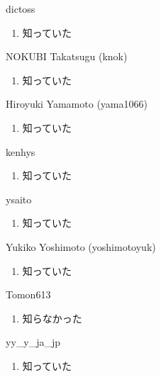 \begin{prework}{ dictoss }
  \begin{enumerate}
  \item 知っていた
  \end{enumerate}
\end{prework}

\begin{prework}{ NOKUBI Takatsugu (knok) }
  \begin{enumerate}
  \item 知っていた
  \end{enumerate}
\end{prework}

\begin{prework}{ Hiroyuki Yamamoto (yama1066) }
  \begin{enumerate}
  \item 知っていた
  \end{enumerate}
\end{prework}

\begin{prework}{ kenhys }
  \begin{enumerate}
  \item 知っていた
  \end{enumerate}
\end{prework}

\begin{prework}{ ysaito }
  \begin{enumerate}
  \item 知っていた
  \end{enumerate}
\end{prework}

\begin{prework}{ Yukiko Yoshimoto (yoshimotoyuk) }
  \begin{enumerate}
  \item 知っていた
  \end{enumerate}
\end{prework}

\begin{prework}{ Tomon613 }
  \begin{enumerate}
  \item 知らなかった
  \end{enumerate}
\end{prework}

\begin{prework}{ yy\_y\_ja\_jp }
  \begin{enumerate}
  \item 知っていた
  \end{enumerate}
\end{prework}

